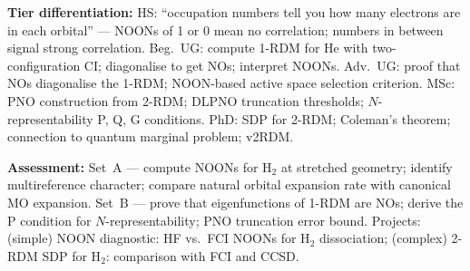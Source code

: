 \documentclass[11pt,a4paper]{article}
\begin{document}
\begin{tcolorbox}[modulebox, title={Module~II.1 --- Lecture L09: Natural Orbitals and the One-Particle Density Matrix}]
\medskip\textbf{Tier differentiation:}
HS: ``occupation numbers tell you how many electrons are in each orbital'' ---
NOONs of 1 or 0 mean no correlation; numbers in between signal strong correlation.
Beg.\ UG: compute 1-RDM for He with two-configuration CI; diagonalise to get NOs; interpret NOONs.
Adv.\ UG: proof that NOs diagonalise the 1-RDM; NOON-based active space selection criterion.
MSc: PNO construction from 2-RDM; DLPNO truncation thresholds; $N$-representability P, Q, G conditions.
PhD: SDP for 2-RDM; Coleman's theorem; connection to quantum marginal problem; v2RDM.

\medskip\textbf{Assessment:}
Set~A --- compute NOONs for H$_2$ at stretched geometry; identify multireference character;
compare natural orbital expansion rate with canonical MO expansion.
Set~B --- prove that eigenfunctions of 1-RDM are NOs; derive the P condition for $N$-representability;
PNO truncation error bound.
Projects: (simple) NOON diagnostic: HF vs.\ FCI NOONs for H$_2$ dissociation;
(complex) 2-RDM SDP for H$_2$: comparison with FCI and CCSD.
\end{tcolorbox}

\medskip
\end{document}
